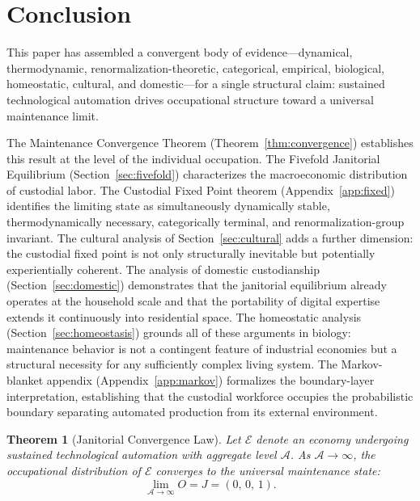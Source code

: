 \documentclass[12pt,a4paper]{article}
\theoremstyle{plain}
\newtheorem{theorem}{Theorem}[section]
\theoremstyle{definition}
\theoremstyle{remark}
\begin{document}
\section{Conclusion}
\label{sec:conclusion}

This paper has assembled a convergent body of evidence---dynamical,
thermodynamic, renormalization-theoretic, categorical, empirical, biological,
homeostatic, cultural, and domestic---for a single structural claim: sustained technological automation
drives occupational structure toward a universal maintenance limit.

The Maintenance Convergence Theorem (Theorem~\ref{thm:convergence}) establishes
this result at the level of the individual occupation.  The Fivefold Janitorial
Equilibrium (Section~\ref{sec:fivefold}) characterizes the macroeconomic
distribution of custodial labor.  The Custodial Fixed Point theorem
(Appendix~\ref{app:fixed}) identifies the limiting state as simultaneously
dynamically stable, thermodynamically necessary, categorically terminal, and
renormalization-group invariant.  The cultural analysis of Section~\ref{sec:cultural} adds a further dimension:
the custodial fixed point is not only structurally inevitable but potentially
experientially coherent.  The analysis of domestic custodianship
(Section~\ref{sec:domestic}) demonstrates that the janitorial equilibrium
already operates at the household scale and that the portability of digital
expertise extends it continuously into residential space.  The homeostatic
analysis (Section~\ref{sec:homeostasis}) grounds all of these arguments in
biology: maintenance behavior is not a contingent feature of industrial
economies but a structural necessity for any sufficiently complex living
system.  The Markov-blanket appendix (Appendix~\ref{app:markov}) formalizes
the boundary-layer interpretation, establishing that the custodial workforce
occupies the probabilistic boundary separating automated production from its
external environment.

\begin{theorem}[Janitorial Convergence Law]
Let $\mathcal{E}$ denote an economy undergoing sustained technological
automation with aggregate level $\mathcal{A}$.  As $\mathcal{A} \to \infty$,
the occupational distribution of $\mathcal{E}$ converges to the universal
maintenance state:
\[
\lim_{\mathcal{A}\to\infty} O = J = (0,\, 0,\, 1).
\]
\end{theorem}
\end{document}
